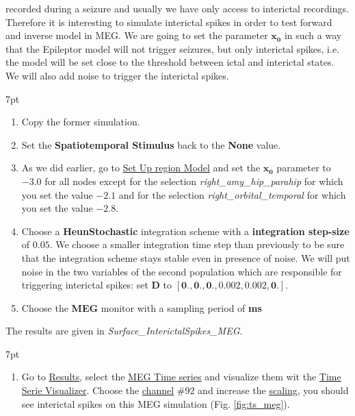 \documentclass{tufte-handout}
\newenvironment{simulation}{%
  \def\FrameCommand{%
    \hspace{1pt}%
    {\color{ForestGreen}\vrule width 2pt}%
    {\color{simulationshade}\vrule width 4pt}%
    \colorbox{simulationshade}%
  }%
  \MakeFramed{\advance\hsize-\width\FrameRestore}%
  \noindent\hspace{-4.55pt}%
  \begin{adjustwidth}{}{7pt}%
  \vspace{2pt}\vspace{2pt}%
}
{%
  \vspace{2pt}\end{adjustwidth}\endMakeFramed%
}
\begin{document}
 recorded during a seizure and usually we have only access to interictal recordings.
Therefore it is interesting to simulate interictal spikes in order to test forward and inverse model in MEG.
We are going to set the parameter $\mathbf{x_0}$ in such a way that the Epileptor model will not trigger seizures, but only interictal spikes, 
i.e. the model will be set close to the threshold between ictal and interictal states. 
We will also add noise to trigger the interictal spikes.

  \begin{simulation}
  \begin{enumerate}
  \item Copy the former simulation.
  \item Set the \textbf{Spatiotemporal Stimulus} back to the \textbf{None} value.
  \item As we did earlier, go to \underline{Set Up region Model} and set the $\mathbf{x_0}$ parameter to $\mathbf{-3.0}$ for all 
  nodes except for the selection \textit{right\_amy\_hip\_parahip} for which you set the value $\mathbf{-2.1}$ and for the selection
  \textit{right\_orbital\_temporal} for which you set the value $\mathbf{-2.8}$.
  \item Choose a \textbf{HeunStochastic} integration scheme with a \textbf{integration step-size} of $\mathbf{0.05}$. We choose
  a smaller integration time step than previously to be sure that  the integration scheme stays stable even in presence of noise.
  We will put noise in the two variables of the second population which are responsible for triggering interictal spikes:
  set $\mathbf{D}$ to $\mathbf{[0., 0., 0., 0.002, 0.002, 0.]}$.
  \item Choose the \textbf{MEG} monitor with a sampling period of \textbf{\unit[1]{ms}}
\end{enumerate}
\end{simulation}

The results are given in \textit{Surface\_InterictalSpikes\_MEG}.

  \begin{simulation}
  \begin{enumerate}
  \item Go to \underline{Results}, select the \underline{MEG Time series} and visualize them wit the \underline{Time Serie Visualizer}.
  Choose the \underline{channel} $\#92$ and increase the \underline{scaling}, you should see interictal spikes on this MEG simulation 
  (Fig. \ref{fig:ts_meg}).
\end{enumerate}
\end{simulation}
\end{document}
